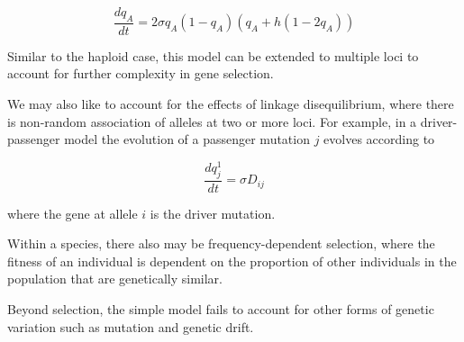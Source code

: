 \[\frac{dq_A}{dt} = 2\sigma q_A(1-q_A)(q_A + h(1-2q_A))\]

Similar to the haploid case, this model can be extended to multiple loci to account for further complexity in gene selection.

We may also like to account for the effects of linkage disequilibrium, where there is non-random association of alleles at two or more loci. For example, in a driver-passenger model the evolution of a passenger mutation $j$ evolves according to

\[\frac{dq_j^1}{dt} = \sigma D_{ij}\]

where the gene at allele $i$ is the driver mutation.

Within a species, there also may be frequency-dependent selection, where the fitness of an individual is dependent on the proportion of other individuals in the population that are genetically similar.

Beyond selection, the simple model fails to account for other forms of genetic variation such as mutation and genetic drift.
